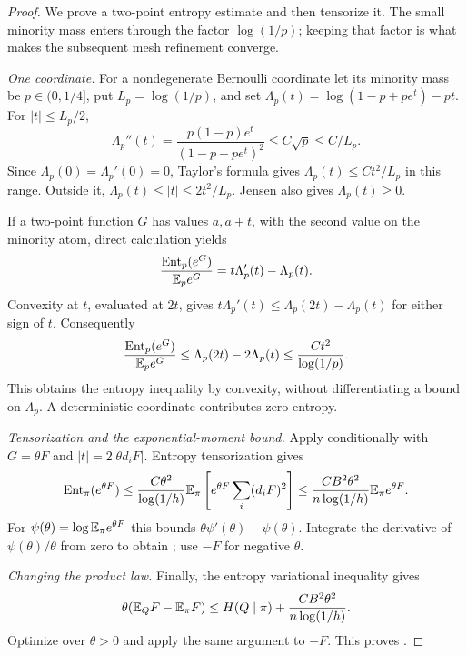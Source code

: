 \begin{proof}
We prove a two-point entropy estimate and then tensorize it.  The
small minority mass enters through the factor $\log(1/p)$; keeping
that factor is what makes the subsequent mesh refinement converge.

\emph{One coordinate.}
For a nondegenerate Bernoulli coordinate let its minority mass be
$p\in(0,1/4]$, put $L_p=\log(1/p)$, and set
$\Lambda_p(t)=\log(1-p+pe^t)-pt$.  For $|t|\le L_p/2$,
\[
 \Lambda_p''(t)
 =\frac{p(1-p)e^t}{(1-p+pe^t)^2}
 \le C\sqrt p\le C/L_p.
\]
Since $\Lambda_p(0)=\Lambda_p'(0)=0$, Taylor's formula gives
$\Lambda_p(t)\le Ct^2/L_p$ in this range.  Outside it,
$\Lambda_p(t)\le|t|\le2t^2/L_p$.  Jensen also gives
$\Lambda_p(t)\ge0$.

If a two-point function $G$ has values $a,a+t$, with the second value
on the minority atom, direct calculation yields
\[
 \frac{\operatorname{Ent}_p(e^G)}{\mathbb E_p e^G}
       =t\Lambda_p'(t)-\Lambda_p(t).
\]
Convexity at $t$, evaluated at $2t$, gives
$t\Lambda_p'(t)\le\Lambda_p(2t)-\Lambda_p(t)$ for either sign of $t$.
Consequently
\begin{equation}
 \frac{\operatorname{Ent}_p(e^G)}{\mathbb E_pe^G}
 \le\Lambda_p(2t)-2\Lambda_p(t)
 \le\frac{Ct^2}{\log(1/p)}.
 \label{eq:path-bernoulli-entropy}
\end{equation}
This obtains the entropy inequality by convexity, without
differentiating a bound on $\Lambda_p$.  A deterministic coordinate
contributes zero entropy.

\emph{Tensorization and the exponential-moment bound.}
Apply  conditionally with
$G=\theta F$ and $|t|=2|\theta d_iF|$.  Entropy tensorization gives
\[
 \operatorname{Ent}_\pi(e^{\theta F})
 \le\frac{C\theta^2}{\log(1/h)}
       \mathbb E_\pi\left[e^{\theta F}\sum_i(d_iF)^2\right]
 \le\frac{CB^2\theta^2}{n\log(1/h)}\mathbb E_\pi e^{\theta F}.
\]
For $\psi(\theta)=\log\mathbb E_\pi e^{\theta F}$ this bounds
$\theta\psi'(\theta)-\psi(\theta)$.  Integrate the derivative of
$\psi(\theta)/\theta$ from zero to obtain
; use $-F$ for negative $\theta$.

\emph{Changing the product law.}
Finally, the entropy variational inequality gives
\[
 \theta(\mathbb E_QF-\mathbb E_\pi F)
 \le H(Q\mid\pi)+\frac{CB^2\theta^2}{n\log(1/h)}.
\]
Optimize over $\theta>0$ and apply the same argument to $-F$.
This proves .
\end{proof}

